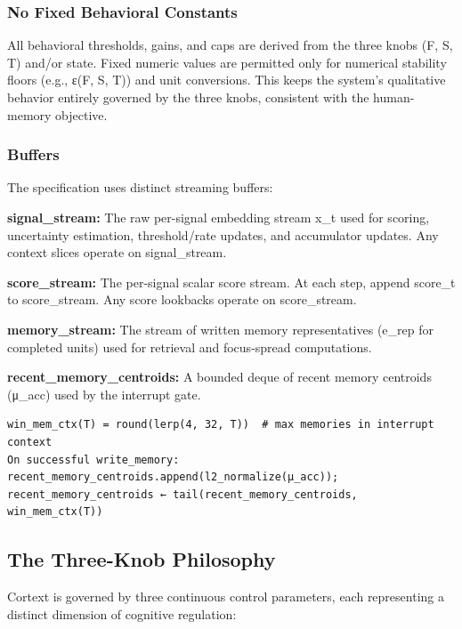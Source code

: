 \documentclass[
  letterpaper,
  DIV=11,
  numbers=noendperiod]{scrartcl}
\begin{document}
\subsubsection{No Fixed Behavioral
Constants}\label{no-fixed-behavioral-constants}

All behavioral thresholds, gains, and caps are derived from the three
knobs (F, S, T) and/or state. Fixed numeric values are permitted only
for numerical stability floors (e.g., ε(F, S, T)) and unit conversions.
This keeps the system's qualitative behavior entirely governed by the
three knobs, consistent with the human-memory objective.

\subsubsection{Buffers}\label{sec-buffers}

The specification uses distinct streaming buffers:

\textbf{signal\_stream:} The raw per-signal embedding stream x\_t used
for scoring, uncertainty estimation, threshold/rate updates, and
accumulator updates. Any context slices operate on signal\_stream.

\textbf{score\_stream:} The per-signal scalar score stream. At each
step, append score\_t to score\_stream. Any score lookbacks operate on
score\_stream.

\textbf{memory\_stream:} The stream of written memory representatives
(e\_rep for completed units) used for retrieval and focus-spread
computations.

\textbf{recent\_memory\_centroids:} A bounded deque of recent memory
centroids (μ\_acc) used by the interrupt gate.

\begin{verbatim}
win_mem_ctx(T) = round(lerp(4, 32, T))  # max memories in interrupt context
On successful write_memory: recent_memory_centroids.append(l2_normalize(μ_acc));
recent_memory_centroids ← tail(recent_memory_centroids, win_mem_ctx(T))
\end{verbatim}

\subsection{The Three-Knob Philosophy}\label{the-three-knob-philosophy}

Cortext is governed by three continuous control parameters, each
representing a distinct dimension of cognitive regulation:
\end{document}
